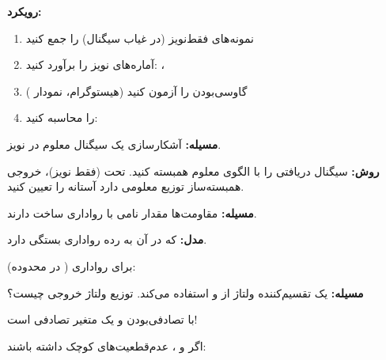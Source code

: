 \textbf{رویکرد:}

\begin{enumerate}
\def\labelenumi{\arabic{enumi}.}
\tightlist
\item
  نمونه‌های فقط‌نویز (در غیاب سیگنال) را جمع کنید
\item
  آماره‌های نویز را برآورد کنید: ، 
\item
  گاوسی‌بودن را آزمون کنید (هیستوگرام، نمودار )
\item
   را محاسبه کنید: 
\end{enumerate}


\textbf{مسیله:} آشکارسازی یک سیگنال معلوم در نویز.

\textbf{روش:} سیگنال دریافتی را با الگوی معلوم همبسته کنید. تحت  (فقط نویز)، خروجی همبسته‌ساز توزیع معلومی دارد \lr{\mbox{\ensuremath{\to}}} آستانه را تعیین کنید.



\textbf{مسیله:} مقاومت‌ها مقدار نامی  با رواداری ساخت دارند.

\textbf{مدل:}  که در آن  به رده رواداری بستگی دارد.

برای رواداری  ( در محدوده): 


\textbf{مسیله:} یک تقسیم‌کننده ولتاژ از  و  استفاده می‌کند. توزیع ولتاژ خروجی چیست؟


با تصادفی‌بودن  و  یک متغیر تصادفی است!


اگر  و ،  عدم‌قطعیت‌های کوچک داشته باشند:



